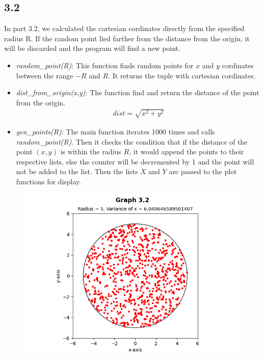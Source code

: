 \documentclass[answers]{exam}
\begin{document}
\subsection*{3.2}
\begin{framed}
  \indent In part $3.2$, we calculated the cartesian cordinates directly from the specified radius R. If the random point lied farther from the distance from the origin, it will be discarded and the program will find a new point.
  \begin{itemize}
    \item \emph{random\_point(R)}: This function finds random points for $x$ and $y$ cordinates between the range $-R$ and $R$. It returns the tuple with cartesian cordinates.\\
    
    \item \emph{dist\_from\_origin(x,y)}: The function find and return the distance of the point from the origin.\\
      \begin{align*}
        dist=\sqrt{x^2+y^2}
      \end{align*}
    \item \emph{gen\_points(R)}: The main function iterates 1000 times and calls \emph{random\_point(R)}. Then it checks the condition that if the distance of the point $(x,y)$ is within the radius $R$, it would append the points to their respective lists, else the counter will be decremented by 1 and the point will not be added to the list. Then the lists $X$ and $Y$ are passed to the plot functions for display.
  \end{itemize}
\end{framed}

\begin{figure}[h]
  \centering
  \includegraphics[scale=0.7]{Q3/Q3(2).png}
\end{figure}
\newpage
\end{document}
